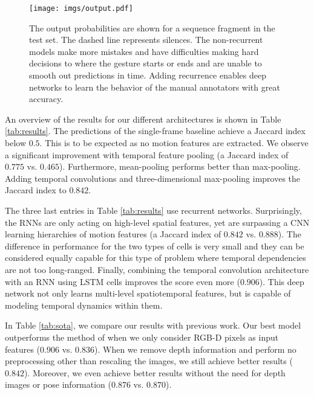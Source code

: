 \documentclass[11pt,a4paper]{article} \usepackage{a4wide}
\begin{document}
\begin{figure}[t]
\begin{center}
\texttt{[image: imgs/output.pdf]}
\end{center}
\caption{The output probabilities are shown for a sequence fragment in the test set. The dashed line represents silences. The non-recurrent models make more mistakes and have difficulties making hard decisions to where the gesture starts or ends and are unable to smooth out predictions in time. Adding recurrence enables deep networks to learn the behavior of the manual annotators with great accuracy.}
\label{fig:classprob}
\end{figure}



An overview of the results for our different architectures is shown in Table \ref{tab:results}. The predictions of the single-frame baseline achieve a Jaccard index below $0.5$. This is to be expected as no motion features are extracted. We observe a significant improvement with temporal feature pooling (a Jaccard index of $0.775$ vs. $0.465$). 
Furthermore, mean-pooling performs better than max-pooling. 
Adding temporal convolutions and three-dimensional max-pooling improves the Jaccard index to $0.842$. 




The three last entries in Table \ref{tab:results} use recurrent networks. Surprisingly, the RNNs are only acting on high-level spatial features, yet are surpassing a CNN learning hierarchies of motion features (a Jaccard index of $0.842$ vs. $0.888$). The difference in performance for the two types of cells is very small and they can be considered equally capable for this type of problem where temporal dependencies are not too long-ranged. Finally, combining the temporal convolution architecture with an RNN using LSTM cells improves the score even more ($0.906$). This deep network not only learns multi-level spatiotemporal features, but is capable of modeling temporal dynamics within them.

In Table \ref{tab:sota}, we compare our results with previous work.  Our best model outperforms the method of \cite{neverova2014moddrop} when we only consider RGB-D pixels as input features ($0.906$ vs. $0.836$). When we remove depth information and perform no preprocessing other than rescaling the images, we still achieve better results ($0.842$). 
Moreover, we even achieve better results without the need for depth images or pose information ($0.876$ vs. $0.870$). 
\end{document}
